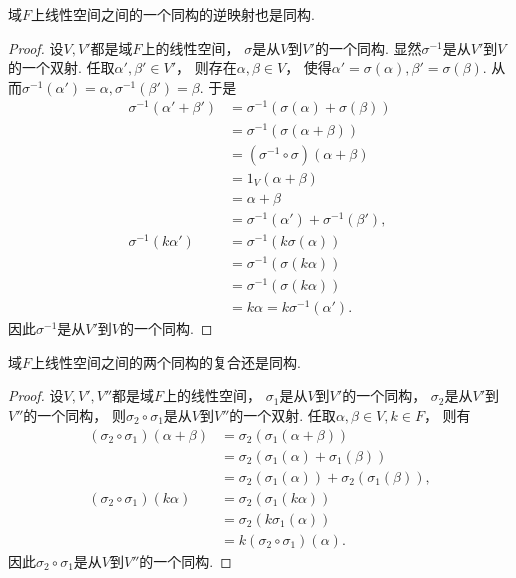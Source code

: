\begin{proposition}\label{theorem:线性空间.线性空间的同构的逆是同构}
域\(F\)上线性空间之间的一个同构的逆映射也是同构.
\begin{proof}
设\(V,V'\)都是域\(F\)上的线性空间，
\(\sigma\)是从\(V\)到\(V'\)的一个同构.
显然\(\sigma^{-1}\)是从\(V'\)到\(V\)的一个双射.
任取\(\alpha',\beta' \in V'\)，
则存在\(\alpha,\beta \in V\)，
使得\(\alpha' = \sigma(\alpha),
\beta' = \sigma(\beta)\).
从而\(\sigma^{-1}(\alpha') = \alpha,
\sigma^{-1}(\beta') = \beta\).
于是\begin{align*}
	\sigma^{-1}(\alpha' + \beta')
	&= \sigma^{-1}(\sigma(\alpha) + \sigma(\beta)) \\
	&= \sigma^{-1}(\sigma(\alpha + \beta)) \\
	&= (\sigma^{-1} \circ \sigma)(\alpha + \beta) \\
	&= 1_V (\alpha + \beta) \\
	&= \alpha + \beta \\
	&= \sigma^{-1}(\alpha') + \sigma^{-1}(\beta'), \\
	\sigma^{-1}(k \alpha')
	&= \sigma^{-1}(k \sigma(\alpha)) \\
	&= \sigma^{-1}(\sigma(k \alpha)) \\
	&= \sigma^{-1}(\sigma(k \alpha)) \\
	&= k \alpha
	= k \sigma^{-1}(\alpha').
\end{align*}
因此\(\sigma^{-1}\)是从\(V'\)到\(V\)的一个同构.
\end{proof}
\end{proposition}

\begin{proposition}\label{theorem:线性空间.线性空间的同构的复合是同构}
域\(F\)上线性空间之间的两个同构的复合还是同构.
\begin{proof}
设\(V,V',V''\)都是域\(F\)上的线性空间，
\(\sigma_1\)是从\(V\)到\(V'\)的一个同构，
\(\sigma_2\)是从\(V'\)到\(V''\)的一个同构，
则\(\sigma_2 \circ \sigma_1\)是从\(V\)到\(V''\)的一个双射.
任取\(\alpha,\beta \in V,
k \in F\)，
则有\begin{align*}
	(\sigma_2 \circ \sigma_1)(\alpha + \beta)
	&= \sigma_2(\sigma_1(\alpha + \beta)) \\
	&= \sigma_2(\sigma_1(\alpha) + \sigma_1(\beta)) \\
	&= \sigma_2(\sigma_1(\alpha)) + \sigma_2(\sigma_1(\beta)), \\
	(\sigma_2 \circ \sigma_1)(k \alpha)
	&= \sigma_2(\sigma_1(k \alpha)) \\
	&= \sigma_2(k \sigma_1(\alpha)) \\
	&= k (\sigma_2 \circ \sigma_1)(\alpha).
\end{align*}
因此\(\sigma_2 \circ \sigma_1\)是从\(V\)到\(V''\)的一个同构.
\end{proof}
\end{proposition}
